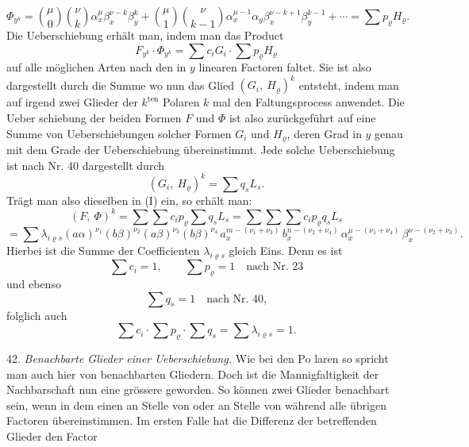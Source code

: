 \[
\Phi_{y^k} = \binom{\mu}{0}\binom{\nu}{k} \alpha_x^\mu \beta_x^{\nu-k} \beta_y^k + \binom{\mu}{1}\binom{\nu}{k-1} \alpha_x^{\mu-1} \alpha_y \beta_x^{\nu-k+1} \beta_y^{k-1} + \cdots = \sum p_\varrho H_\varrho.
\]
Die Ueberschiebung erhält man, indem man das Product
\[
F_{y^k}\cdot \Phi_{y^k} = \sum c_i G_i \cdot \sum p_\varrho H_\varrho
\]
auf alle möglichen Arten nach den in $y$ linearen Factoren faltet. Sie
ist also dargestellt durch die Summe
wo nun das Glied $(G_i,\ H_\varrho)^k$ entsteht, indem man auf irgend zwei
Glieder der $k^{\text{ten}}$ Polaren $k$ mal den Faltungsprocess anwendet. Die Ueber\-
schiebung der beiden Formen $F$ und $\Phi$ ist also zurückgeführt auf
eine Summe von Ueberschiebungen solcher Formen $G_i$ und $H_\varrho$, deren
Grad in $y$ genau mit dem Grade der Ueberschiebung übereinstimmt.
Jede solche Ueberschiebung ist nach Nr. 40 dargestellt durch
\[
(G_i,\ H_\varrho)^k = \sum q_s L_s.
\]
Trägt man also dieselben in (I) ein, so erhält man:
\[
(F,\ \Phi)^k = \sum\sum c_i p_\varrho \sum q_s L_s = \sum\sum\sum c_i p_\varrho q_s L_s
\]
\[
= \sum \lambda_{i\varrho s}(a\alpha)^{\nu_1}(b\beta)^{\nu_2}(a\beta)^{\nu_3}(b\beta)^{\nu_4}\, a_x^{m-(\nu_1+\nu_3)}\, b_x^{n-(\nu_2+\nu_4)}\, \alpha_x^{\mu-(\nu_1+\nu_4)}\, \beta_x^{\nu-(\nu_2+\nu_3)}.
\]
Hierbei ist die Summe der Coefficienten $\lambda_{i\varrho s}$ gleich Eins. Denn
es ist
\[
\sum c_i = 1, \qquad \sum p_\varrho = 1 \quad \text{nach Nr. 23}
\]
und ebenso
\[
\sum q_s = 1 \quad \text{nach Nr. 40,}
\]
folglich auch
\[
\sum c_i \cdot \sum p_\varrho \cdot \sum q_s = \sum \lambda_{i\varrho s} = 1.
\]

42. \textit{Benachbarte Glieder einer Ueberschiebung.} Wie bei den Po\-
laren so spricht man auch hier von benachbarten Gliedern. Doch ist
die Mannigfaltigkeit der Nachbarschaft nun eine grössere geworden.
So können zwei Glieder benachbart sein, wenn in dem einen an
Stelle von
oder an Stelle von
während alle übrigen Factoren übereinstimmen. Im ersten Falle hat
die Differenz der betreffenden Glieder den Factor


